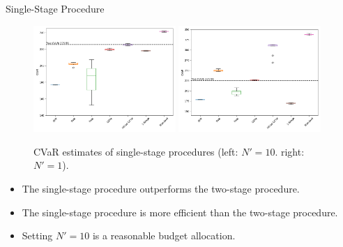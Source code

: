 \documentclass[9pt,handout]{beamer}
\begin{document}
\begin{frame}{Single-Stage Procedure}

    \begin{figure}[ht!]
        \centering
        \includegraphics[width=0.48\textwidth]{../project2/figures/singleStage/CVaRmediumNoise.png}
        \includegraphics[width=0.48\textwidth]{../project2/figures/singleStage/CVaRhighNoise.png}
        \caption{CVaR estimates of single-stage procedures (left: $N' = 10$. right: $N' = 1$).}
    \end{figure}

    \begin{itemize}
        \item   The single-stage procedure outperforms the two-stage procedure.
        \item   The single-stage procedure is more efficient than the two-stage procedure.
        \item   Setting $N' = 10$ is a reasonable budget allocation.
    \end{itemize}

\end{frame}
\end{document}
